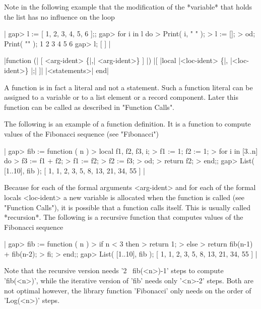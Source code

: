 Note  in  the following example that  the  modification of the *variable*
that holds the list has no influence on the loop

|    gap> l := [ 1, 2, 3, 4, 5, 6 ];;
    gap> for i  in l  do
    >        Print( i, " " );
    >        l := [];
    > od;  Print( "\n" );
    1 2 3 4 5 6
    gap> l;
    [  ] |

%
%
%

|function (| [ <arg-ident> \{|,| <arg-ident>\} ] |)
    |[ |local   |<loc-ident> \{|, |<loc-ident>\} |;| ]|
    |<statements>|
end|

A function is in fact  a literal  and  not  a statement.  Such a function
literal can be  assigned to a variable  or to  a list element or a record
component.  Later  this function can  be called as described in "Function
Calls".

The following is an example  of a function definition.   It is a function
to compute values of the Fibonacci sequence (see "Fibonacci")

|    gap> fib := function ( n )
    >         local  f1,  f2,  f3,  i;
    >         f1 := 1;  f2 := 1;
    >         for i  in [3..n]  do
    >             f3 := f1 + f2;
    >             f1 := f2;
    >             f2 := f3;
    >         od;
    >         return f2;
    >     end;;
    gap> List( [1..10], fib );
    [ 1, 1, 2, 3, 5, 8, 13, 21, 34, 55 ] |

Because for  each of the formal arguments <arg-ident> and for each of the
formal locals <loc-ident>  a  new variable is allocated when the function
is called (see "Function  Calls"), it is  possible that a  function calls
itself.  This is usually called *recursion*. The following is a recursive
function that computes values of the Fibonacci sequence

|    gap> fib := function ( n )
    >         if n < 3  then
    >             return 1;
    >         else
    >             return fib(n-1) + fib(n-2);
    >         fi;
    >     end;;
    gap> List( [1..10], fib );
    [ 1, 1, 2, 3, 5, 8, 13, 21, 34, 55 ] |

Note that the recursive version needs '2 \*\ fib(<n>)-1' steps to compute
'fib(<n>)', while the  iterative version   of 'fib'  needs  only  '<n>-2'
steps.   Both are not optimal  however,  the library function 'Fibonacci'
only needs on the order of 'Log(<n>)' steps.

